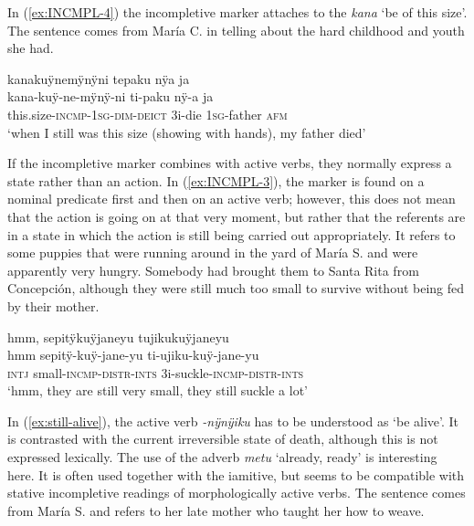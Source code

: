 In (\ref{ex:INCMPL-4}) the incompletive marker attaches to the  \textit{kana} ‘be of this size’. The sentence comes from María C. in telling about the hard childhood and youth she had.

\ea\label{ex:INCMPL-4}
\begingl
\glpreamble kanakuÿnemÿnÿni tepaku nÿa ja\\
\gla kana-kuÿ-ne-mÿnÿ-ni ti-paku nÿ-a ja\\
\glb this.size-\textsc{incmp}-1\textsc{sg}-\textsc{dim}-\textsc{deict} 3i-die 1\textsc{sg}-father \textsc{afm}\\
\glft ‘when I still was this size (showing with hands), my father died’
\endgl
\trailingcitation{[ump-p110815sf.149]}
\xe


If the incompletive marker combines with active verbs, they normally express a state rather than an action. In (\ref{ex:INCMPL-3}), the marker is found on a nominal predicate first and then on an active verb; however, this does not mean that the action is going on at that very moment, but rather that the referents are in a state in which the action is still being carried out appropriately. It refers to some puppies that were running around in the yard of María S. and were apparently very hungry. Somebody had brought them to Santa Rita from Concepción, although they were still much too small to survive without being fed by their mother.

\ea\label{ex:INCMPL-3}
\begingl 
\glpreamble hmm, sepitÿkuÿjaneyu tujikukuÿjaneyu\\
\gla hmm sepitÿ-kuÿ-jane-yu ti-ujiku-kuÿ-jane-yu\\ 
\glb \textsc{intj} small-\textsc{incmp}-\textsc{distr}-\textsc{ints} 3i-suckle-\textsc{incmp}-\textsc{distr}-\textsc{ints}\\ 
\glft ‘hmm, they are still very small, they still suckle a lot’\\ 
\endgl
\trailingcitation{[rxx-e120511l.364]}
\xe


In (\ref{ex:still-alive}), the active verb \textit{-nÿnÿiku} has to be understood as ‘be alive’. It is contrasted with the current irreversible state of death, although this is not expressed lexically. The use of the adverb \textit{metu} ‘already, ready’ is interesting here. It is often used together with the iamitive, but seems to be compatible with stative incompletive readings of morphologically active verbs. The sentence comes from María S. and refers to her late mother who taught her how to weave.

